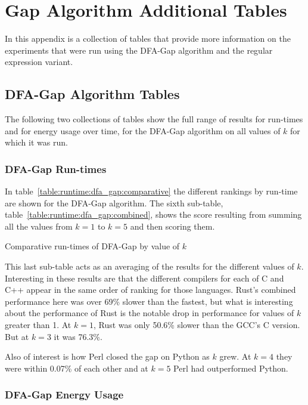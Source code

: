\section{Gap Algorithm Additional Tables}
\label{sec:extra_tables}

In this appendix is a collection of tables that provide more information on the experiments that were run using the DFA-Gap algorithm and the regular expression variant.

\subsection{DFA-Gap Algorithm Tables}

The following two collections of tables show the full range of results for run-times and for energy usage over time, for the DFA-Gap algorithm on all values of $k$ for which it was run.

\subsubsection{DFA-Gap Run-times}

In table~\ref{table:runtime:dfa_gap:comparative} the different rankings by run-time are shown for the DFA-Gap algorithm. The sixth sub-table, table~\ref{table:runtime:dfa_gap:combined}, shows the score resulting from summing all the values from $k=1$ to $k=5$ and then scoring them.

\begin{table}[!htb]

\caption{Comparative run-times of DFA-Gap by value of $k$}
\label{table:runtime:dfa_gap:comparative}
\end{table}

This last sub-table acts as an averaging of the results for the different values of $k$. Interesting in these results are that the different compilers for each of C and C++ appear in the same order of ranking for those languages. Rust's combined performance here was over 69\% slower than the fastest, but what is interesting about the performance of Rust is the notable drop in performance for values of $k$ greater than 1. At $k=1$, Rust was only 50.6\% slower than the GCC's C version. But at $k=3$ it was 76.3\%.

Also of interest is how Perl closed the gap on Python as $k$ grew. At $k=4$ they were within 0.07\% of each other and at $k=5$ Perl had outperformed Python.

\subsubsection{DFA-Gap Energy Usage}


